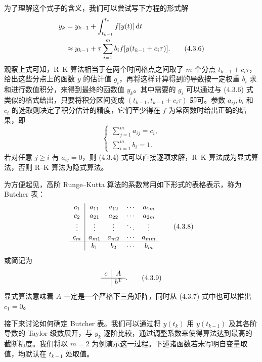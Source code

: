 为了理解这个式子的含义，我们可以尝试写下方程的形式解
\begin{align}
 y_k
 &=y_{k-1}+\int_{t_{k-1}}^{t_k}f[y(t)]\,\mathrm dt\notag\\
 &\approx y_{k-1}+\tau\sum_{i=1}^{m}b_i f[y(t_{k-1}+c_i\tau)].
\tag{4.3.6}
\end{align}
观察上式可知，R--K 算法相当于在两个时间格点之间取了 $m$ 个分点 $t_{k-1}+c_i\tau$，给出这些分点上的函数 $y$ 的估计值 $g_i$，再将这样计算得到的导数按一定权重 $b_i$ 求和进行数值积分，来得到最终的函数值 $y_k$。其中需要的 $g_i$ 可以通过与 (4.3.6) 式类似的格式给出，只要将积分区间变成 $(t_{k-1},t_{k-1}+c_i\tau)$ 即可。参数 $a_{ij},b_i$ 和 $c_i$ 的选取则决定了积分估计的精度，它们至少得在 $f$ 为常函数时给出正确的结果，即
\begin{equation}
\begin{cases}
\displaystyle\sum_{j=1}^{m}a_{ij}=c_i,\\[4pt]
\displaystyle\sum_{i=1}^{m}b_i=1.
\end{cases}
\tag{4.3.7}
\end{equation}
若对任意 $j\ge i$ 有 $a_{ij}=0$，则 (4.3.4) 式可以直接逐项求解，R--K 算法成为显式算法，否则 R--K 算法为隐式算法。

为方便起见，高阶 Runge--Kutta 算法的系数常用如下形式的表格表示，称为 Butcher 表：
\begin{equation}
\begin{array}{c|cccc}
 c_1&a_{11}&a_{12}&\cdots&a_{1m}\\
 c_2&a_{21}&a_{22}&\cdots&a_{2m}\\
 \vdots&\vdots&\vdots&\ddots&\vdots\\
 c_m&a_{m1}&a_{m2}&\cdots&a_{mm}\\ \hline
 &b_1&b_2&\cdots&b_m
\end{array}
\tag{4.3.8}
\end{equation}
或简记为
\begin{equation}
\begin{array}{c|c}
 c&A\\ \hline
 &b^{\mathrm T}
\end{array}.
\tag{4.3.9}
\end{equation}
显式算法意味着 $A$ 一定是一个严格下三角矩阵，同时从 (4.3.7) 式中也可以推出 $c_1=0$。

接下来讨论如何确定 Butcher 表。我们可以通过将 $y(t_k)$ 用 $y(t_{k-1})$ 及其各阶导数的 Taylor 级数展开，与 $y_k$ 逐阶比较，通过调整系数来使得算法达到最高的截断精度。我们将以 $m=2$ 为例演示这一过程。下述诸函数若未写明自变量取值，均默认在 $t_{k-1}$ 处取值。

